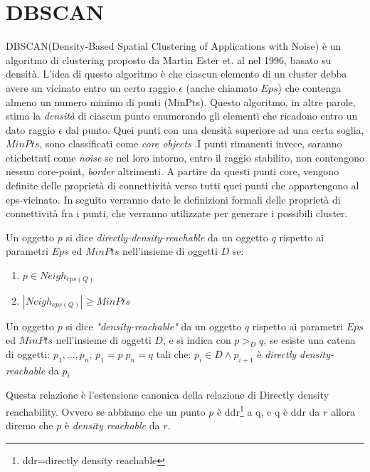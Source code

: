 \section{DBSCAN}
DBSCAN\cite{Ester96adensity}(Density-Based Spatial Clustering of Applications with Noise) è un algoritmo di clustering proposto da Martin Ester et. al nel 1996, basato su densità. 
L'idea di questo algoritmo è che ciascun elemento di un cluster debba avere un vicinato entro un certo raggio $\epsilon$ (anche chiamato $Eps$)  che contenga almeno un numero minimo di punti (MinPts). Questo algoritmo, in altre parole, stima la \emph{densità} di ciascun punto  enumerando gli elementi che ricadono entro un dato raggio $\epsilon$ dal punto. Quei punti con una densità superiore ad una certa soglia, $MinPts$, sono classificati come \textit{core objects} .I punti rimanenti invece, saranno etichettati come \emph{noise} se nel loro intorno, entro il raggio stabilito, non contengono nessun core-point, \emph{border} altrimenti. A partire da questi punti core, vengono definite delle proprietà di connettività verso  tutti quei punti che appartengono al eps-vicinato.
In seguito verranno date le definizioni formali delle proprietà di connettività fra i punti, che verranno utilizzate per generare i possibili cluster.
\begin{definizione}
\label{def:ddr}
Un oggetto $p$ si dice 	\emph{directly-density-reachable} da un oggetto $q$ rispetto ai parametri $Eps$ ed $MinPts$ nell'insieme di oggetti $D$ se:
\begin{enumerate}
\item $p \in Neigh_{eps(Q)}$
\item $|Neigh_{eps(Q)}| \ge MinPts$
\end{enumerate}
\end{definizione}
\begin{definizione}
\label{def:dr} 
Un oggetto   $p$ si dice 	\emph{"density-reachable"} da un oggetto $q$ rispetto ai parametri $Eps$ ed $MinPts$ nell'insieme di oggetti $D$, e si  indica con \emph{$p>_{D}q$}, se esiste una catena di oggetti: $p_1,\dots,p_n$, $p_1=p\; p_n=q$ tali che:  $p_{i} \in D  \land p_{i+1}$ è \emph{directly density-reachable} da $p_{i}$
\end{definizione}
Questa relazione è l'estensione canonica della relazione di  Directly density reachability. Ovvero se abbiamo che un punto $p$ è ddr\footnote{ddr=directly density reachable} a q, e q è ddr da $r$ allora diremo che $p$ è \emph{density reachable} da $r$.
